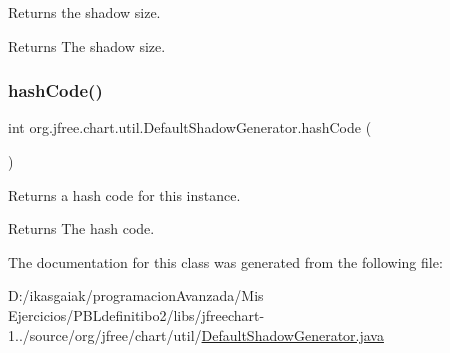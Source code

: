 Returns the shadow size.

\begin{DoxyReturn}{Returns}
The shadow size. 
\end{DoxyReturn}
\mbox{\label{classorg_1_1jfree_1_1chart_1_1util_1_1_default_shadow_generator_ac7f5cef9916ef70f18dfcd8ca1eeef27}} 
\subsubsection{\texorpdfstring{hash\+Code()}{hashCode()}}
{\footnotesize\ttfamily int org.\+jfree.\+chart.\+util.\+Default\+Shadow\+Generator.\+hash\+Code (\begin{DoxyParamCaption}{ }\end{DoxyParamCaption})}

Returns a hash code for this instance.

\begin{DoxyReturn}{Returns}
The hash code. 
\end{DoxyReturn}


The documentation for this class was generated from the following file\+:\begin{DoxyCompactItemize}
\item 
D\+:/ikasgaiak/programacion\+Avanzada/\+Mis Ejercicios/\+P\+B\+Ldefinitibo2/libs/jfreechart-\/1../source/org/jfree/chart/util/\mbox{\hyperlink{_default_shadow_generator_8java}{Default\+Shadow\+Generator.\+java}}\end{DoxyCompactItemize}
